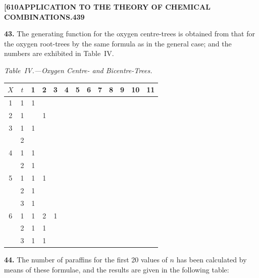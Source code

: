\documentclass[11pt,a4paper]{book}
\begin{document}
{\newpage
\noindent\textbf{[610}\hspace{\fill}\textbf{APPLICATION TO THE THEORY OF CHEMICAL COMBINATIONS.}\hspace{\fill}\textbf{439}

\noindent\textbf{43.}
The generating function for the oxygen centre-trees is obtained from that for the oxygen root-trees by the same formula as in the general case; and the numbers are exhibited in Table~IV.

\medskip
\noindent\textit{Table~IV.---Oxygen Centre- and Bicentre-Trees.}
\begin{center}
\small
\begin{longtable}{|c|c|c|c|c|c|c|c|c|c|c|c|c|}
\hline
$X$ & $t$ & 1 & 2 & 3 & 4 & 5 & 6 & 7 & 8 & 9 & 10 & 11 \\
\hline
\endfirsthead
1 & 1 & 1 & & & & & & & & & & \\
\hline
2 & 1 & & 1 & & & & & & & & & \\
\hline
3 & 1 & 1 & & & & & & & & & & \\
  & 2 & & & & & & & & & & & \\
\hline
4 & 1 & 1 & & & & & & & & & & \\
  & 2 & 1 & & & & & & & & & & \\
\hline
5 & 1 & 1 & 1 & & & & & & & & & \\
  & 2 & 1 & & & & & & & & & & \\
  & 3 & 1 & & & & & & & & & & \\
\hline
6 & 1 & 1 & 2 & 1 & & & & & & & & \\
  & 2 & 1 & 1 & & & & & & & & & \\
  & 3 & 1 & 1 & & & & & & & & & \\
\hline
\end{longtable}
\end{center}

\medskip
\noindent\textbf{44.}
The number of paraffins for the first 20 values of $n$ has been calculated by means of these formulae, and the results are given in the following table:

}
\end{document}

